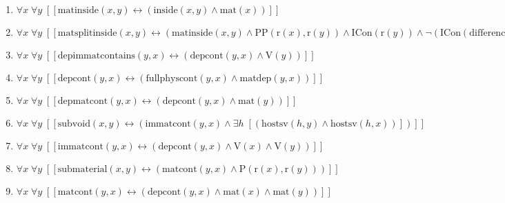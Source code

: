 \documentclass{article}
\begin{document}
\begin{enumerate}
\item $\forall x\; \forall y\;  \left[ \left[ \textrm{matinside}(x,y) \leftrightarrow \left(\textrm{inside}(x,y) \land \textrm{mat}(x)\right) \right] \right]$
\item $\forall x\; \forall y\;  \left[ \left[ \textrm{matsplitinside}(x,y) \leftrightarrow \left(\textrm{matinside}(x,y) \land \textrm{PP}(\textrm{r}(x),\textrm{r}(y)) \land \textrm{ICon}(\textrm{r}(y)) \land \neg \left(\textrm{ICon}(\textrm{difference}(\textrm{r}(y),\textrm{r}(x)))\right)\right) \right] \right]$
\item $\forall x\; \forall y\;  \left[ \left[ \textrm{depimmatcontains}(y,x) \leftrightarrow \left(\textrm{depcont}(y,x) \land \textrm{V}(y)\right) \right] \right]$
\item $\forall x\; \forall y\;  \left[ \left[ \textrm{depcont}(y,x) \leftrightarrow \left(\textrm{fullphyscont}(y,x) \land \textrm{matdep}(y,x)\right) \right] \right]$
\item $\forall x\; \forall y\;  \left[ \left[ \textrm{depmatcont}(y,x) \leftrightarrow \left(\textrm{depcont}(y,x) \land \textrm{mat}(y)\right) \right] \right]$
\item $\forall x\; \forall y\;  \left[ \left[ \textrm{subvoid}(x,y) \leftrightarrow \left(\textrm{immatcont}(y,x) \land \exists h\;  \left[ \left(\textrm{hostsv}(h,y) \land \textrm{hostsv}(h,x)\right) \right]\right) \right] \right]$
\item $\forall x\; \forall y\;  \left[ \left[ \textrm{immatcont}(y,x) \leftrightarrow \left(\textrm{depcont}(y,x) \land \textrm{V}(x) \land \textrm{V}(y)\right) \right] \right]$
\item $\forall x\; \forall y\;  \left[ \left[ \textrm{submaterial}(x,y) \leftrightarrow \left(\textrm{matcont}(y,x) \land \textrm{P}(\textrm{r}(x),\textrm{r}(y))\right) \right] \right]$
\item $\forall x\; \forall y\;  \left[ \left[ \textrm{matcont}(y,x) \leftrightarrow \left(\textrm{depcont}(y,x) \land \textrm{mat}(x) \land \textrm{mat}(y)\right) \right] \right]$
\end{enumerate}
\end{document}
